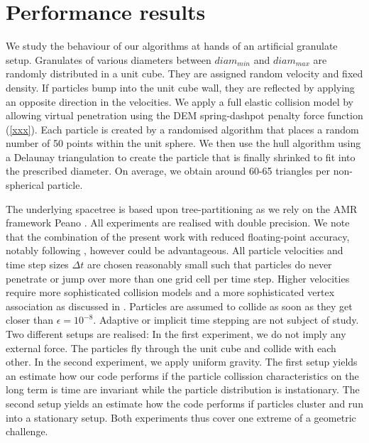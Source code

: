 \section{Performance results}
\label{section:results}

We study the behaviour of our algorithms at hands of an artificial granulate
setup. 
Granulates of various diameters between $diam_{min}$ and $diam_{max}$ are
randomly distributed in a unit cube.
They are assigned random velocity and fixed density. 
If particles bump into the unit cube wall, they are reflected by applying an opposite direction in the velocities. 
We apply a full elastic collision model by allowing virtual penetration using the DEM spring-dashpot penalty force function (\ref{xxx}).
Each particle is created by a randomised algorithm that places a random number
of 50 points within the unit sphere. 
We then use the hull algorithm \cite{xxxx} using a Delaunay triangulation to
create the particle that is finally shrinked to fit into the prescribed
diameter.
On average, we obtain around 60-65 triangles per non-spherical particle.


The underlying spacetree is based upon tree-partitioning as we rely on the AMR
framework Peano \cite{Software:Peano}.
All experiments are realised with double precision. 
We note that the combination of the present work with reduced
floating-point accuracy, notably following
\cite{Weinzierl:15:Compression}, however could be advantageous.
All particle velocities and time step sizes $ \Delta t$ are chosen reasonably
small such that particles do never penetrate or jump over more than one grid cell per time step.
Higher velocities require more sophisticated collision models and a more
sophisticated vertex association as discussed in \cite{Weinzierl:16:PIC}.
Particles are assumed to collide as soon as they get closer than $\epsilon =
10^{-8}$.
Adaptive or implicit time stepping \cite{xxx} are not subject of study.
Two different setups are realised: In the first experiment, we do not imply any
external force.
The particles fly through the unit cube and collide with each other.
In the second experiment, we apply uniform gravity.
The first setup yields an estimate how our code performs if the particle collission
characteristics on the long term is time are invariant while the particle
distribution is instationary.
The second setup yields an estimate how the code performs if particles cluster
and run into a stationary setup.
Both experiments thus cover one extreme of a geometric challenge.


